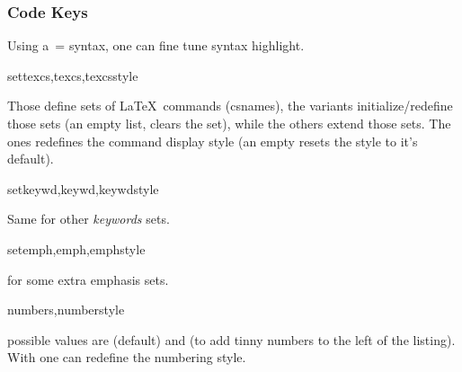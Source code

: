 \documentclass{article}
\begin{document}
\subsubsection{Code Keys}
Using a \,= syntax, one can fine tune  syntax highlight.

\begin{codedescribe}[key]{settexcs,texcs,texcsstyle}
\begin{codesyntax}%
\end{codesyntax}
Those define sets of \LaTeX~commands (csnames), the  variants initialize/redefine those sets (an empty list, clears the set), while the others extend those sets. The  ones redefines the command display style (an empty  resets the style to it's default).\\
\end{codedescribe}

\begin{codedescribe}[key]{setkeywd,keywd,keywdstyle}
\begin{codesyntax}	%
\end{codesyntax}
Same for other \emph{keywords} sets.\\
\end{codedescribe}

\begin{codedescribe}[key]{setemph,emph,emphstyle}
\begin{codesyntax}	%
\end{codesyntax}
for some extra emphasis sets.\\
\end{codedescribe}

\begin{codedescribe}[key]{numbers,numberstyle}
\begin{codesyntax} %
\end{codesyntax}
 possible values are  (default) and  (to add tinny numbers to the left of the listing). With  one can redefine the numbering style.\\
\end{codedescribe}
\end{document}
